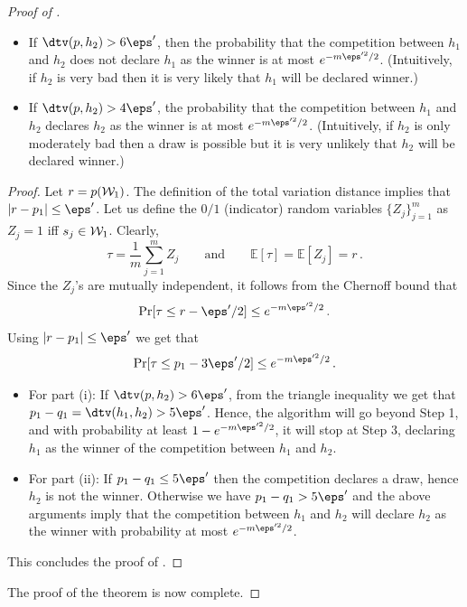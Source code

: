 \begin{proof}[Proof of ]
\begin{lemma}
\begin{itemize}
\item[(i)] If $\dtv(p, h_2)>6 \eps'$, then the probability that the competition between
$h_1$ and $h_2$ does not declare $h_1$ as the winner is at most $e^{- {m \eps'^2 /2 } }$.  (Intuitively,
if $h_2$ is very bad then it is very likely that $h_1$ will be declared winner.)

\item[(ii)]  If $\dtv(p, h_2)>4 \eps'$, the probability that the competition between $h_1$
and $h_2$ declares $h_2$ as the winner is at most $e^{- {m \eps'^2/ 2 } }$.  (Intuitively, if $h_2$
is only moderately bad then a draw is possible but it is very unlikely that $h_2$ will be declared winner.)
\end{itemize}
\end{lemma}


%
\begin{proof}
Let $r=p({\cal W}_1)$. The definition of the total variation distance
implies that $|r-p_1| \le \eps'$. Let us define the $0/1$ (indicator)
random variables $\{Z_j\}_{j=1}^m$ as $Z_j=1$ iff $s_j \in {\cal
  W}_1$. Clearly, \[
\tau=\frac{1}{m} \sum_{j=1}^m Z_j\qquad\text{and}\qquad
\mathbb{E}[\tau]=\mathbb{E}[Z_j]=r\,.
\]
Since the $Z_j$'s are mutually independent, it follows from the
Chernoff bound that 
\[
\Pr[\tau \le r-{\eps'/2}] \le e^{- {m \eps'^2/2 } }\,.
\]
Using $|r-p_1| \le \eps'$ we get that 
\[
\Pr[\tau\le p_1-{3\eps'/2}] \le e^{- {m \eps'^2/2 } }\,.
\]
\begin{itemize}
\item For part (i): If $\dtv(p, h_2) > 6 \eps'$, from the triangle inequality we get that $p_1-q_1=\dtv(h_1, h_2) > 5 \eps' $.  Hence, the algorithm will go beyond Step 1, and with probability at least $1-e^{- {m \eps'^2/2 } }$, it will stop at Step 3, declaring $h_1$ as the winner of the competition between $h_1$ and $h_2$.

\item For part (ii):  If $p_1-q_1 \leq 5 \eps'$ then the competition declares a draw, hence $h_2$ is not the winner. Otherwise we have $p_1 - q_1 > 5\eps'$ and the above arguments imply that the competition between $h_1$ and $h_2$ will declare $h_2$ as the winner with probability at most $e^{- {m \eps'^2/2 } }$.
\end{itemize}
This concludes the proof of .
\end{proof}

\noindent
The proof of the theorem is now complete.
\end{proof}

